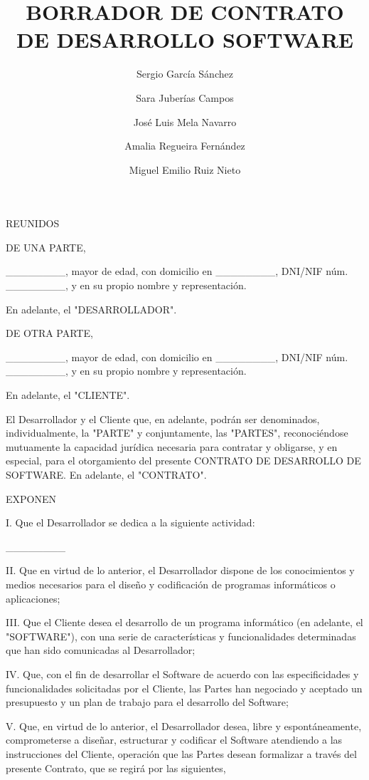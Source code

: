 \documentclass[a4paper,11pt]{report}
\begin{document}
\title{BORRADOR DE CONTRATO DE DESARROLLO SOFTWARE}
\author{
  Sergio García Sánchez
  \and
  Sara Juberías Campos
  \and
  José Luis Mela Navarro
  \and
  Amalia Regueira Fernández
  \and
  Miguel Emilio Ruiz Nieto
}

\maketitle

REUNIDOS

DE UNA PARTE,

\_\_\_\_\_\_\_\_, mayor de edad, con domicilio en \_\_\_\_\_\_\_\_, DNI/NIF núm.
\_\_\_\_\_\_\_\_, y en su propio nombre y representación.

En adelante, el "DESARROLLADOR".

DE OTRA PARTE,

\_\_\_\_\_\_\_\_, mayor de edad, con domicilio en \_\_\_\_\_\_\_\_, DNI/NIF núm.
\_\_\_\_\_\_\_\_, y en su propio nombre y representación.

En adelante, el "CLIENTE".

El Desarrollador y el Cliente que, en adelante, podrán ser denominados,
individualmente, la "PARTE" y conjuntamente, las "PARTES",
reconociéndose mutuamente la capacidad jurídica necesaria para contratar
y obligarse, y en especial, para el otorgamiento del presente CONTRATO
DE DESARROLLO DE SOFTWARE. En adelante, el "CONTRATO".

EXPONEN

I. Que el Desarrollador se dedica a la siguiente actividad:

\_\_\_\_\_\_\_\_

II. Que en virtud de lo anterior, el Desarrollador dispone de los
conocimientos y medios necesarios para el diseño y codificación de
programas informáticos o aplicaciones;

III. Que el Cliente desea el desarrollo de un programa informático (en
adelante, el "SOFTWARE"), con una serie de características y
funcionalidades determinadas que han sido comunicadas al Desarrollador;

IV. Que, con el fin de desarrollar el Software de acuerdo con las
especificidades y funcionalidades solicitadas por el Cliente, las Partes
han negociado y aceptado un presupuesto y un plan de trabajo para el
desarrollo del Software;

V. Que, en virtud de lo anterior, el Desarrollador desea, libre y
espontáneamente, comprometerse a diseñar, estructurar y codificar el
Software atendiendo a las instrucciones del Cliente, operación que las
Partes desean formalizar a través del presente Contrato, que se regirá
por las siguientes,
\end{document}
